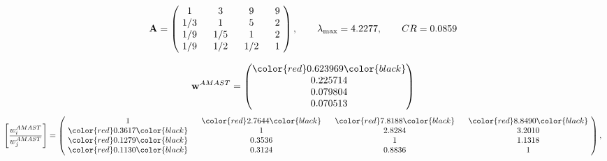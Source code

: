 \begin{example}
\begin{equation*}
\mathbf{A} =
\begin{pmatrix}
$\,\,$ 1 $\,\,$ & $\,\,$3$\,\,$ & $\,\,$9$\,\,$ & $\,\,$9 $\,\,$ \\
$\,\,$ 1/3$\,\,$ & $\,\,$ 1 $\,\,$ & $\,\,$5$\,\,$ & $\,\,$2 $\,\,$ \\
$\,\,$ 1/9$\,\,$ & $\,\,$ 1/5$\,\,$ & $\,\,$ 1 $\,\,$ & $\,\,$2 $\,\,$ \\
$\,\,$ 1/9$\,\,$ & $\,\,$ 1/2$\,\,$ & $\,\,$ 1/2$\,\,$ & $\,\,$ 1  $\,\,$ \\
\end{pmatrix},
\qquad
\lambda_{\max} =
4.2277,
\qquad
CR = 0.0859
\end{equation*}

\begin{equation*}
\mathbf{w}^{AMAST} =
\begin{pmatrix}
\color{red} 0.623969\color{black} \\
0.225714\\
0.079804\\
0.070513
\end{pmatrix}\end{equation*}
\begin{equation*}
\left[ \frac{{w}^{AMAST}_i}{{w}^{AMAST}_j} \right] =
\begin{pmatrix}
$\,\,$ 1 $\,\,$ & $\,\,$\color{red} 2.7644\color{black} $\,\,$ & $\,\,$\color{red} 7.8188\color{black} $\,\,$ & $\,\,$\color{red} 8.8490\color{black} $\,\,$ \\
$\,\,$\color{red} 0.3617\color{black} $\,\,$ & $\,\,$ 1 $\,\,$ & $\,\,$2.8284$\,\,$ & $\,\,$3.2010  $\,\,$ \\
$\,\,$\color{red} 0.1279\color{black} $\,\,$ & $\,\,$0.3536$\,\,$ & $\,\,$ 1 $\,\,$ & $\,\,$1.1318 $\,\,$ \\
$\,\,$\color{red} 0.1130\color{black} $\,\,$ & $\,\,$0.3124$\,\,$ & $\,\,$0.8836$\,\,$ & $\,\,$ 1  $\,\,$ \\
\end{pmatrix},
\end{equation*}


\end{example}
